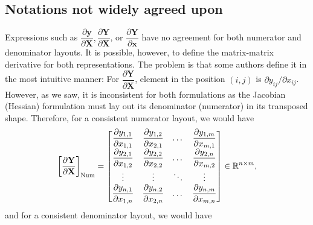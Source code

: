\documentclass{article}
\begin{document}
\subsection{Notations not widely agreed upon}
\label{sub-sec:notations-not-agreed}
Expressions such as \(\dfrac{\partial \mathbf{y}}{\partial \mathbf{X}}, \dfrac{\partial \mathbf{Y}}{\partial \mathbf{X}}\), or \(\dfrac{\partial \mathbf{Y}}{\partial \mathbf{x}}\) have no agreement for both numerator and denominator layouts. It is possible, however, to define the matrix-matrix derivative for both representations. The problem is that some authors define it in the most intuitive manner: For \(\dfrac{\partial \mathbf{Y}}{\partial \mathbf{X}}\), element in the position \((i,j)\) is \(\partial y_{ij}/\partial x_{ij}\). However, as we saw, it is inconsistent for both formulations as the Jacobian (Hessian) formulation must lay out its denominator (numerator) in its transposed shape. Therefore, for a consistent numerator layout, we would have
\begin{align}
    \left[\frac{\partial \mathbf{Y}}{\partial\mathbf{X}}\right]_{\textnormal{Num}} = \begin{bmatrix}
        \dfrac{\partial y_{1,1}}{\partial x_{1,1}} & \dfrac{\partial y_{1,2}}{\partial x_{2,1}} & \dots & \dfrac{\partial y_{1,m}}{\partial x_{m,1}} \\
        \dfrac{\partial y_{2,1}}{\partial x_{1,2}} & \dfrac{\partial y_{2,2}}{\partial x_{2,2}} & \dots & \dfrac{\partial y_{2,n}}{\partial x_{m,2}} \\
        \vdots & \vdots & \ddots & \vdots \\
        \dfrac{\partial y_{n,1}}{\partial x_{1,n}} & \dfrac{\partial y_{n,2}}{\partial x_{2,n}} & \dots & \dfrac{\partial y_{n,m}}{\partial x_{m,n}} \\
    \end{bmatrix} \in \mathbb{R}^{n\times m},
\end{align}
and for a consistent denominator layout, we would have
\end{document}
